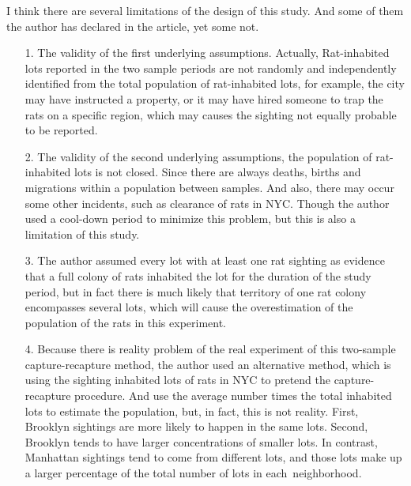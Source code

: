 \documentclass[10pt,letterpaper]{article}
\begin{document}
I think there are several limitations of the design of this study. And some of them the author has declared in the article, yet some not.\\
\begin{enumerate}[leftmargin=0cm,itemindent=.5cm,labelwidth=\itemindent,labelsep=0cm,align=left]
\item[1. ] The validity of the first underlying assumptions. Actually, Rat-inhabited lots reported in the two sample periods are not randomly and independently identified from the total population of rat-inhabited lots, for example, the city may have instructed a property, or it may have hired someone to trap the rats on a specific region, which may causes the sighting not equally probable to be reported. 

\item[2. ] The validity of the second underlying assumptions, the population of rat-inhabited lots is not closed. Since there are always deaths, births and migrations within a population between samples. And also, there may occur some other incidents, such as clearance of rats in NYC. Though the author used a cool-down period to minimize this problem, but this is also a limitation of this study. 

\item[3. ] The author assumed every lot with at least one rat sighting as evidence that a full colony of rats inhabited the lot for the duration of the study period, but in fact there is much likely that territory of one rat colony encompasses several lots, which will cause the overestimation of the population of the rats in this experiment. 

\item[4. ] Because there is reality problem of the real experiment of this two-sample capture-recapture method, the author used an alternative method, which is using the sighting inhabited lots of rats in NYC to pretend the capture-recapture procedure. And use the average number times the total inhabited lots to estimate the population, but, in fact, this is not reality. First, Brooklyn sightings are more likely to happen in the same lots. Second,
Brooklyn tends to have larger concentrations of smaller lots. In contrast, Manhattan sightings tend to come from different lots, and those lots make up a larger percentage of the total number of lots in each neighborhood.
\end{enumerate}

\end{document}
